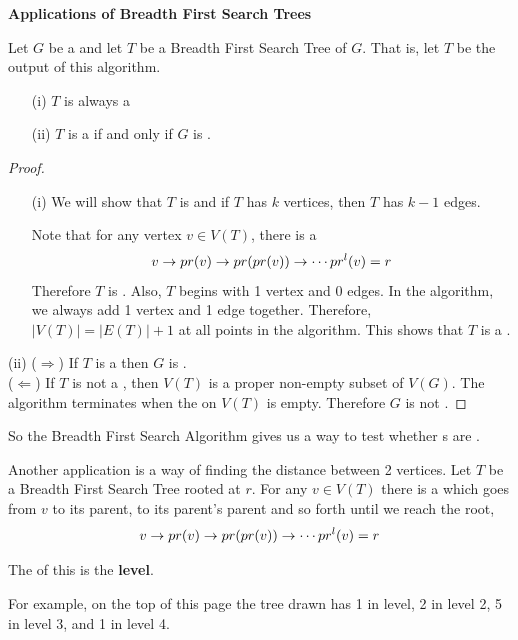 \documentclass[english, 11pt]{article}
\begin{document}
\textbf{Applications of Breadth First Search Trees} \\

\begin{thrm}
  Let $G$ be a  and let $T$ be a Breadth First Search Tree of $G$. That is, let $T$ be the output of this algorithm. \begin{itemize}
    \item[(i)]$T$ is always a 
    \item[(ii)]$T$ is a  if and only if $G$ is .
  \end{itemize}
\end{thrm}

\begin{proof}
  \begin{itemize}
    \item[(i)] We will show that $T$ is  and if $T$ has $k$ vertices, then $T$ has $k - 1$ edges.

    Note that for any vertex $v \in V(T)$, there is a 
    \[ v\rightarrow pr(v) \rightarrow pr(pr(v)) \rightarrow \cdots pr^l(v) = r \]
    Therefore $T$ is . Also, $T$ begins with 1 vertex and 0 edges. In the algorithm, we always add 1 vertex and 1 edge together. Therefore, $|V(T)| = |E(T)| +1$ at all points in the algorithm. This shows that $T$ is a .
  \end{itemize}
  \item[(ii)] ($\Longrightarrow$) If $T$ is a  then $G$ is . \\
  ($\Longleftarrow$) If $T$ is not a , then $V(T)$ is a proper non-empty subset of $V(G)$. The algorithm terminates when the  on $V(T)$ is empty. Therefore $G$ is not .
\end{proof}
So the Breadth First Search Algorithm gives us a way to test whether s are .

Another application is a way of finding the distance between 2 vertices. Let $T$ be a Breadth First Search Tree rooted at $r$. For any $v \in V(T)$ there is a  which goes from $v$ to its parent, to its parent's parent and so forth until we reach the root,
\[ v\rightarrow pr(v) \rightarrow pr(pr(v)) \rightarrow \cdots pr^l(v) = r \]
\begin{defn}[level]\label{level}
The  of this  is the \textbf{level}.
\end{defn}
For example, on the top of this page the tree drawn has 1 in level, 2 in level 2, 5 in level 3, and 1 in level 4. \\
\end{document}
